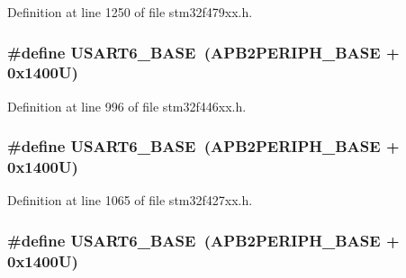 Definition at line 1250 of file stm32f479xx.\+h.

\subsubsection[{\texorpdfstring{U\+S\+A\+R\+T6\+\_\+\+B\+A\+SE}{USART6_BASE}}]{\setlength{\rightskip}{0pt plus 5cm}\#define U\+S\+A\+R\+T6\+\_\+\+B\+A\+SE~({\bf A\+P\+B2\+P\+E\+R\+I\+P\+H\+\_\+\+B\+A\+SE} + 0x1400\+U)}\hypertarget{group___peripheral__memory__map_gade4d3907fd0387ee832f426f52d568bb}{}\label{group___peripheral__memory__map_gade4d3907fd0387ee832f426f52d568bb}


Definition at line 996 of file stm32f446xx.\+h.

\subsubsection[{\texorpdfstring{U\+S\+A\+R\+T6\+\_\+\+B\+A\+SE}{USART6_BASE}}]{\setlength{\rightskip}{0pt plus 5cm}\#define U\+S\+A\+R\+T6\+\_\+\+B\+A\+SE~({\bf A\+P\+B2\+P\+E\+R\+I\+P\+H\+\_\+\+B\+A\+SE} + 0x1400\+U)}\hypertarget{group___peripheral__memory__map_gade4d3907fd0387ee832f426f52d568bb}{}\label{group___peripheral__memory__map_gade4d3907fd0387ee832f426f52d568bb}


Definition at line 1065 of file stm32f427xx.\+h.

\subsubsection[{\texorpdfstring{U\+S\+A\+R\+T6\+\_\+\+B\+A\+SE}{USART6_BASE}}]{\setlength{\rightskip}{0pt plus 5cm}\#define U\+S\+A\+R\+T6\+\_\+\+B\+A\+SE~({\bf A\+P\+B2\+P\+E\+R\+I\+P\+H\+\_\+\+B\+A\+SE} + 0x1400\+U)}\hypertarget{group___peripheral__memory__map_gade4d3907fd0387ee832f426f52d568bb}{}\label{group___peripheral__memory__map_gade4d3907fd0387ee832f426f52d568bb}


